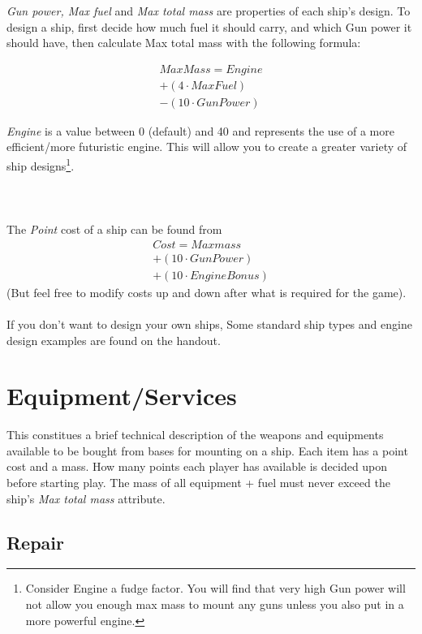 \documentclass[a4paper,12pt,notitlepage,twocolumn]{article}
\begin{document}
\emph{Gun power, Max fuel} and \emph{Max total mass} are properties of
each ship's design. To design a ship, first decide how much
fuel it should carry, and which Gun power it should have, then
calculate Max total mass with the following formula: 

\begin{eqnarray*}
  MaxMass = Engine \\ + (4\cdot MaxFuel) \\ - (10\cdot GunPower)
\end{eqnarray*}

\emph{Engine} is a value between 0 (default) and
40 and represents the use of a more efficient/more futuristic
engine. This will allow you to create a greater variety 
of ship designs\footnote{Consider Engine a fudge factor. You will
  find that very high Gun power will not allow you enough max mass to mount
  any guns unless you also put in a more powerful engine.}.
\\\\
\\\\
The \emph{Point} cost of a ship can be found from 
\begin{eqnarray*}
  Cost = Maxmass \\+ (10\cdot GunPower) \\+ (10\cdot EngineBonus)
\end{eqnarray*}
(But feel free to modify costs up and down after what is required for
the game). 
\\\\
If you don't want to design your own ships, Some
standard ship types and engine design examples are found on the
handout.  

\section{Equipment/Services}
\label{sec:equipment}

This constitues a brief technical description of the weapons and
equipments available to be bought from bases for mounting on a
ship. Each item has a point cost and a mass. How many points each
player has available is decided upon before starting play. The mass of
all equipment + fuel must never exceed the ship's \emph{Max total mass} attribute. 

\subsection{Repair}
\end{document}
